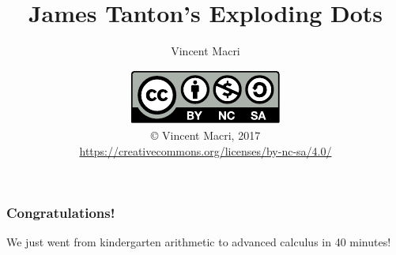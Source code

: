 

\usepackage{mathtools}




\frenchspacing

\title{James Tanton's Exploding Dots}
\author{Vincent Macri}
\date{\includegraphics{by-nc-sa}\\\copyright{} Vincent Macri, 2017\\\footnotesize\url{https://creativecommons.org/licenses/by-nc-sa/4.0/}}


\newenvironment{whatif}%
	{\begin{namedframe}{What if\ldots}\Huge What if\ldots\normalsize

	}
	{\end{namedframe}}

\newcommand{\bigframe}[1]{\begin{namedframe}{#1}\Huge\centering#1\end{namedframe}}


	\frame{\titlepage}
	
	
	
	
	
	
	
	\begin{frame}
		\frametitle{Congratulations!}
		We just went from kindergarten arithmetic to advanced calculus in 40 minutes!
	\end{frame}

